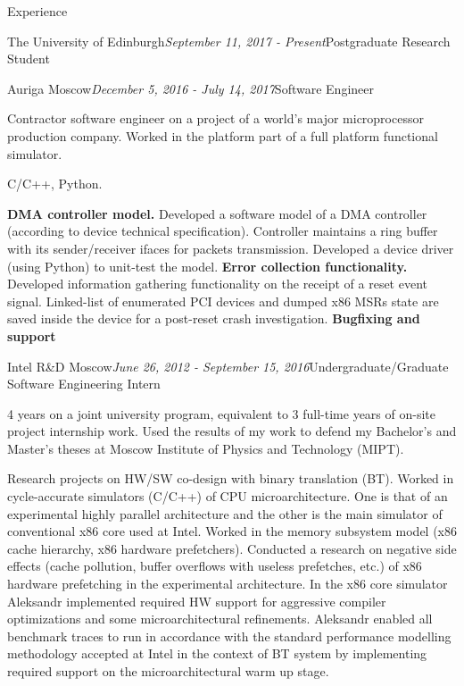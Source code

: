 \documentclass{resume} %
\begin{document}
\begin{rSection}{Experience}
\begin{rSubsection}{{\large The University of Edinburgh}}{\textit{September 11, 2017 - Present}}{Postgraduate Research Student}{}
\end{rSubsection}
\begin{rSubsection}{{\large Auriga Moscow}}{\textit{December 5, 2016 - July 14, 2017}}{Software Engineer}{}
\begin{description}[font=$\bullet$~\normalfont\scshape\color{red!50!black}, width=0.95\textwidth]
\item [Role] Contractor software engineer on a project of a world's major microprocessor production company. Worked in the platform part of a full platform functional simulator.
\item [Technologies] C/C++, Python.
\item [Tasks] {\bf DMA controller model.} Developed a software model of a DMA controller (according to device technical specification). Controller maintains a ring buffer with its sender/receiver ifaces for packets transmission. Developed a device driver (using Python) to unit-test the model.
{\bf Error collection functionality.} Developed information gathering functionality on the receipt of a reset event signal. Linked-list of enumerated PCI devices and dumped x86 MSRs state are saved inside the device for a post-reset crash investigation.
{\bf Bugfixing and support}
\end{description}
\end{rSubsection}

\begin{rSubsection}{{\large Intel R\&D Moscow}}{\textit{June 26, 2012 - September 15, 2016}}{Undergraduate/Graduate Software Engineering Intern}{}
\begin{description}[font=$\bullet$~\normalfont\scshape\color{red!50!black}, width=0.95\textwidth]
\item [Joint University Program] 4 years on a joint university program, equivalent to 3 full-time years of on-site project internship work. Used the results of my work to defend my Bachelor's and Master's theses at Moscow Institute of Physics and Technology (MIPT).
\item [Projects and Work] Research projects on HW/SW co-design with binary translation (BT). Worked in cycle-accurate simulators (C/C++) of CPU microarchitecture. One is that of an experimental highly parallel architecture and the other is the main simulator of conventional x86 core used at Intel. Worked in the memory subsystem model (x86 cache hierarchy, x86 hardware prefetchers). Conducted a research on negative side effects (cache pollution, buffer overflows with useless prefetches, etc.) of x86 hardware prefetching in the experimental architecture. In the x86 core simulator Aleksandr implemented required HW support for aggressive compiler optimizations and some microarchitectural refinements. Aleksandr enabled all benchmark traces to run in accordance with the standard performance modelling methodology accepted at Intel in the context of BT system by implementing required support on the microarchitectural warm up stage.
\end{description}
\end{rSubsection}

\end{rSection}
\end{document}
